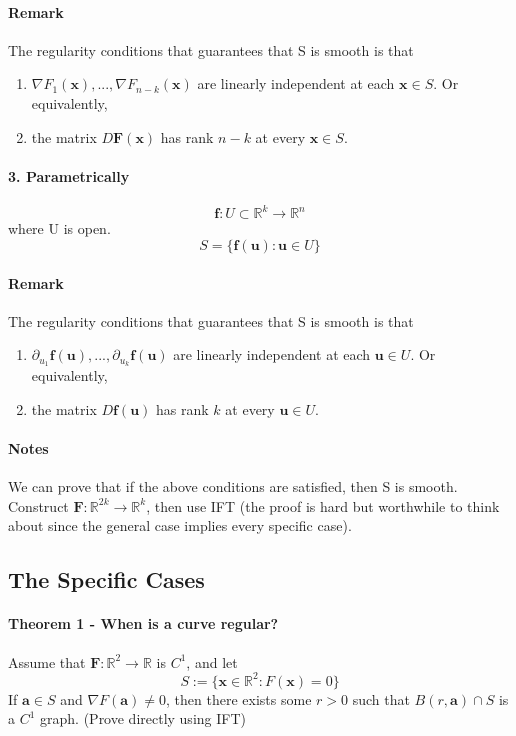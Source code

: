 \documentclass[11pt]{article}
\newcommand{\tb}[1]{\textbf{#1}}
\newcommand{\real}[0]{\mathbb{R}}
\newcommand{\func}[3]{\tb{#1}: {#2} \rightarrow {#3} }
\begin{document}
\paragraph{Remark} The regularity conditions that guarantees that S is smooth is that
\begin{enumerate}
	\item $\nabla F_1(\tb{x}), ..., \nabla F_{n-k}(\tb{x})$ are linearly independent at each $\tb{x} \in S$. Or equivalently,
	\item the matrix $D\tb{F}(\tb{x})$ has rank $n-k$ at every $\tb{x} \in S$.
\end{enumerate}
\paragraph{3. Parametrically}
$$\func{f}{U \subset \real^k}{\real^{n}}$$ where U is open.
$$ S = \{\tb{f}(\tb{u}): \tb{u} \in U\}$$
\paragraph{Remark} The regularity conditions that guarantees that S is smooth is that
\begin{enumerate}
	\item $\partial_{u_1}\tb{f}(\tb{u}),...,\partial_{u_k}\tb{f}(\tb{u})$ are linearly independent at each $\tb{u} \in U$. Or equivalently,
	\item the matrix $D\tb{f}(\tb{u})$ has rank $k$ at every $\tb{u} \in U$.
\end{enumerate}
\paragraph{Notes} We can prove that if the above conditions are satisfied, then S is smooth. Construct $\func{F}{\real^{2k}}{\real^k}$, then use IFT (the proof is hard but worthwhile to think about since the general case implies every specific case).

\subsection{The Specific Cases}
\paragraph{Theorem 1 - When is a curve regular?}
Assume that $\func{F}{\real^2}{\real}$ is $C^1$, and let
$$S:=\{\tb{x} \in \real^2: F(\tb{x}) = 0 \}$$
If $\tb{a} \in S$ and $\nabla F(\tb{a}) \neq 0$, then there exists some $r>0$ such that $B(r, \tb{a}) \cap S$ is a $C^1$ graph. \newline
(Prove directly using IFT)
\end{document}
